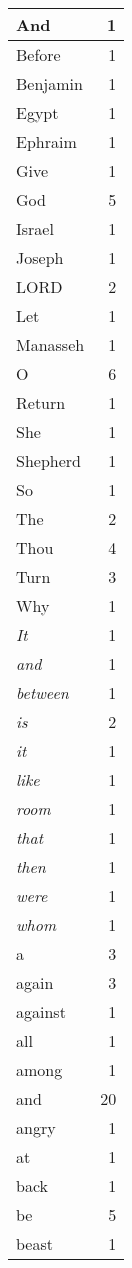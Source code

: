 \begin{center}
\begin{longtable}{l|r}
\hline \hline
\endlastfoot
And & 1 \\ \hline
Before & 1 \\ \hline
Benjamin & 1 \\ \hline
Egypt & 1 \\ \hline
Ephraim & 1 \\ \hline
Give & 1 \\ \hline
God & 5 \\ \hline
Israel & 1 \\ \hline
Joseph & 1 \\ \hline
LORD & 2 \\ \hline
Let & 1 \\ \hline
Manasseh & 1 \\ \hline
O & 6 \\ \hline
Return & 1 \\ \hline
She & 1 \\ \hline
Shepherd & 1 \\ \hline
So & 1 \\ \hline
The & 2 \\ \hline
Thou & 4 \\ \hline
Turn & 3 \\ \hline
Why & 1 \\ \hline
\emph{It} & 1 \\ \hline
\emph{and} & 1 \\ \hline
\emph{between} & 1 \\ \hline
\emph{is} & 2 \\ \hline
\emph{it} & 1 \\ \hline
\emph{like} & 1 \\ \hline
\emph{room} & 1 \\ \hline
\emph{that} & 1 \\ \hline
\emph{then} & 1 \\ \hline
\emph{were} & 1 \\ \hline
\emph{whom} & 1 \\ \hline
a & 3 \\ \hline
again & 3 \\ \hline
against & 1 \\ \hline
all & 1 \\ \hline
among & 1 \\ \hline
and & 20 \\ \hline
angry & 1 \\ \hline
at & 1 \\ \hline
back & 1 \\ \hline
be & 5 \\ \hline
beast & 1 \\ \hline

\end{longtable}
\end{center}
